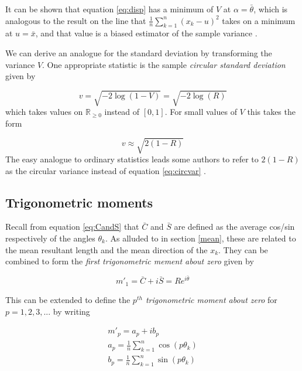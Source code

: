 \documentclass[12pt]{article}
\numberwithin{equation}{section}
\numberwithin{figure}{section}
\begin{document}
It can be shown that equation \ref{eq:disp} has a minimum of $V$ at $\alpha = \bar{\theta}$, which is analogous to the result on the line that $\frac{1}{n}\sum_{k=1}^n(x_k-u)^2$ takes on a minimum at $u=\bar{x}$, and that value is a biased estimator of the sample variance \cite{Kanti}. 

We can derive an analogue for the standard deviation by transforming the variance $V$. One appropriate statistic is the sample \textit{circular standard deviation} given by

\begin{equation}\label{eq:stdev}
v = \sqrt{-2 \log(1-V)} = \sqrt{-2 \log(R)}
\end{equation}
which takes values on $\mathbb{R}_{\ge 0}$ instead of $[0,1]$. For small values of $V$ this takes the form

\begin{equation}\label{eq:smallstdev}
v \approx \sqrt{2(1-R)}
\end{equation}
The easy analogue to ordinary statistics leads some authors to refer to $2(1-R)$ as the circular variance instead of equation \ref{eq:circvar} \cite{Kanti}.

\subsection{Trigonometric moments}

Recall from equation \ref{eq:CandS} that $\bar{C}$ and $\bar{S}$ are defined as the average cos/sin respectively of the angles $\theta_k$. As alluded to in section \ref{mean}, these are related to the mean resultant length and the mean direction of the $x_k$. They can be combined to form the \textit{first trigonometric mement about zero} given by

\begin{equation}\label{eq:1sttm}
m'_1 = \bar{C}+i\bar{S} = R e^{i\bar{\theta}}
\end{equation}

This can be extended to define the \textit{$p^{th}$ trigonometric moment about zero} for $p=1,2,3,...$ by writing

\begin{equation}\label{eq:pthtm}
\begin{aligned}
m'_p = a_p+ ib_p\\
a_p = \frac{1}{n}\sum_{k=1}^n \cos(p\theta_k)\\
b_p = \frac{1}{n}\sum_{k=1}^n \sin(p\theta_k)\\
\end{aligned}
\end{equation}
\end{document}
